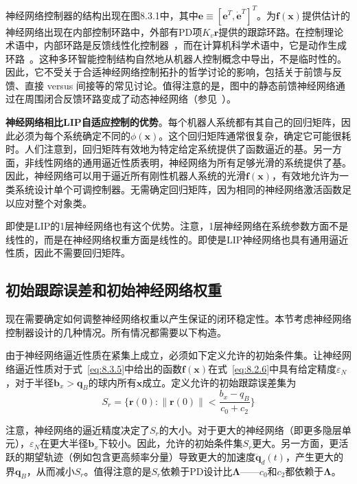 \documentclass[12pt,a4paper]{ctexart}
\begin{document}
神经网络控制器的结构出现在图8.3.1中，其中$\bm{e} \equiv [\bm{e}^T, \dot{\bm{e}}^T]^T$。为$\bm{f}(\bm{x})$提供估计的神经网络出现在内部控制环路中，外部有PD项$K_v\bm{r}$提供的跟踪环路。在控制理论术语中，内部环路是反馈线性化控制器~\cite{slotine1991}，而在计算机科学术语中，它是动作生成环路~\cite{werbos1992,miller1991,white1992}。这种多环智能控制结构自然地从机器人控制概念中导出，不是临时性的。因此，它不受关于合适神经网络控制拓扑的哲学讨论的影响，包括关于前馈与反馈、直接 versus 间接等的常见讨论。值得注意的是，图中的静态前馈神经网络通过在周围闭合反馈环路变成了动态神经网络（参见~\cite{narendra1991}）。

\textbf{神经网络相比LIP自适应控制的优势}。每个机器人系统都有其自己的回归矩阵，因此必须为每个系统确定不同的$\phi(\bm{x})$。这个回归矩阵通常很复杂，确定它可能很耗时。人们注意到，回归矩阵有效地为特定给定系统提供了函数逼近的基。另一方面，非线性网络的通用逼近性质表明，神经网络为所有足够光滑的系统提供了基。因此，神经网络可以用于逼近所有刚性机器人系统的光滑$\bm{f}(\bm{x})$，有效地允许为一类系统设计单个可调控制器。无需确定回归矩阵，因为相同的神经网络激活函数足以应对整个对象类。

即使是LIP的1层神经网络也有这个优势。注意，1层神经网络在系统参数方面不是线性的，而是在神经网络权重方面是线性的。即使是LIP神经网络也具有通用逼近性质，因此不需要回归矩阵。

\subsection{初始跟踪误差和初始神经网络权重}

现在需要确定如何调整神经网络权重以产生保证的闭环稳定性。本节考虑神经网络控制器设计的几种情况。所有情况都需要以下构造。

由于神经网络逼近性质在紧集上成立，必须如下定义允许的初始条件集。让神经网络逼近性质对于式~\eqref{eq:8.3.5}中给出的函数$\bm{f}(\bm{x})$在式~\eqref{eq:8.2.6}中具有给定精度$\varepsilon_N$，对于半径$\bm{b}_x > \bm{q}_B$的球内所有$\bm{x}$成立。定义允许的初始跟踪误差集为
\begin{equation}\label{eq:8.3.15}
S_r = \{\bm{r}(0): \|\bm{r}(0)\| < \frac{b_x - q_B}{c_0 + c_2}\}
\end{equation}

注意，神经网络的逼近精度决定了$S_r$的大小。对于更大的神经网络（即更多隐层单元），$\varepsilon_N$在更大半径$\bm{b}_x$下较小。因此，允许的初始条件集$S_r$更大。另一方面，更活跃的期望轨迹（例如包含更高频率分量）导致更大的加速度$\ddot{\bm{q}}_d(t)$，产生更大的界$\bm{q}_B$，从而减小$S_r$。值得注意的是$S_r$依赖于PD设计比$\bm{\Lambda}$——$c_0$和$c_2$都依赖于$\bm{\Lambda}$。
\end{document}
